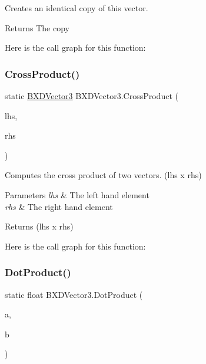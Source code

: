 Creates an identical copy of this vector. 

\begin{DoxyReturn}{Returns}
The copy
\end{DoxyReturn}
Here is the call graph for this function\+:
\mbox{\label{class_b_x_d_vector3_ae71ca5cd2508572c76c60ee21f702d3a}} 
\subsubsection{\texorpdfstring{Cross\+Product()}{CrossProduct()}}
{\footnotesize\ttfamily static \hyperlink{class_b_x_d_vector3}{B\+X\+D\+Vector3} B\+X\+D\+Vector3.\+Cross\+Product (\begin{DoxyParamCaption}\item[{\hyperlink{class_b_x_d_vector3}{B\+X\+D\+Vector3}}]{lhs,  }\item[{\hyperlink{class_b_x_d_vector3}{B\+X\+D\+Vector3}}]{rhs }\end{DoxyParamCaption})\hspace{0.3cm}{\ttfamily [static]}}



Computes the cross product of two vectors. (lhs x rhs) 


\begin{DoxyParams}{Parameters}
{\em lhs} & The left hand element\\
\hline
{\em rhs} & The right hand element\\
\hline
\end{DoxyParams}
\begin{DoxyReturn}{Returns}
(lhs x rhs)
\end{DoxyReturn}
Here is the call graph for this function\+:
\mbox{\label{class_b_x_d_vector3_ad0b239d2be5d8b8a5845ed1030a1d1cb}} 
\subsubsection{\texorpdfstring{Dot\+Product()}{DotProduct()}}
{\footnotesize\ttfamily static float B\+X\+D\+Vector3.\+Dot\+Product (\begin{DoxyParamCaption}\item[{\hyperlink{class_b_x_d_vector3}{B\+X\+D\+Vector3}}]{a,  }\item[{\hyperlink{class_b_x_d_vector3}{B\+X\+D\+Vector3}}]{b }\end{DoxyParamCaption})\hspace{0.3cm}{\ttfamily [static]}}



